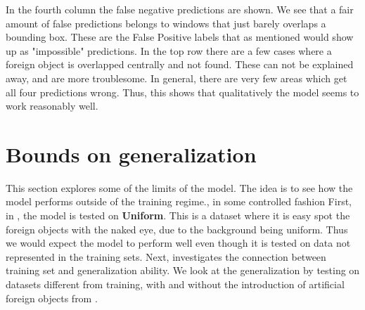 In the fourth column the false negative predictions are shown.
We see that a fair amount of false predictions belongs to windows that just barely overlaps a bounding box. These are the False Positive labels that as mentioned would show up as "impossible" predictions. In the top row there are a few cases where a foreign object is overlapped centrally and not found. These can not be explained away, and are more troublesome. In general, there are very few areas which get all four predictions wrong. Thus, this shows that qualitatively the model seems to work reasonably well.
\section{Bounds on generalization}
\label{sec:limits}
This section explores some of the limits of the model. The idea is to see how the model performs outside of the training regime., in some controlled fashion
First, in , the model is tested on \textbf{Uniform}. This is a dataset where it is easy spot the foreign objects with the naked eye, due to the background being uniform. Thus we would expect the model to perform well even though it is tested on data not represented in the training sets.
Next,  investigates the connection between training set and generalization ability.
We look at the generalization by testing on datasets different from training, with and without the introduction of artificial foreign objects from .%

